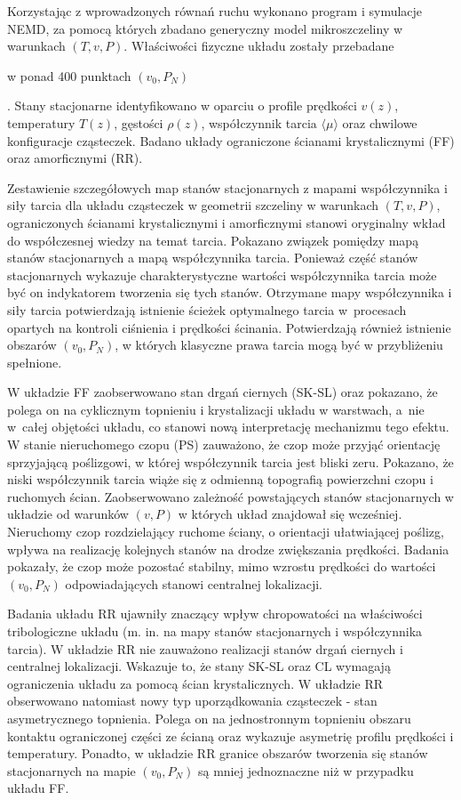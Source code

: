 \documentclass[12pt,a4paper,openright]{report} %
\begin{document}
Korzystając z wprowadzonych równań ruchu wykonano program i symulacje NEMD, za pomocą których zbadano generyczny model mikroszczeliny w warunkach $(T, v, P)$. Właściwości fizyczne układu zostały przebadane \begin{samepage} w ponad 400 punktach $(v_0, P_N)$ \end{samepage}. Stany stacjonarne identyfikowano w oparciu o profile prędkości $v(z)$, temperatury $T(z)$, gęstości $\rho(z)$, współczynnik tarcia $\langle \mu \rangle$ oraz chwilowe konfiguracje cząsteczek. Badano układy ograniczone ścianami krystalicznymi (FF) oraz amorficznymi (RR). 

Zestawienie szczegółowych map stanów stacjonarnych z mapami współczynnika i siły tarcia dla układu cząsteczek w geometrii szczeliny w warunkach $(T, v, P)$, ograniczonych ścianami krystalicznymi i amorficznymi stanowi oryginalny wkład do współczesnej wiedzy na temat tarcia.  
Pokazano związek pomiędzy mapą stanów stacjonarnych a mapą współczynnika tarcia. Ponieważ część stanów stacjonarnych wykazuje charakterystyczne wartości współczynnika tarcia może być on indykatorem tworzenia się tych stanów. 
Otrzymane mapy współczynnika i siły tarcia potwierdzają istnienie ścieżek optymalnego tarcia w~procesach opartych na kontroli ciśnienia i prędkości ścinania. Potwierdzają również istnienie obszarów $(v_0, P_N)$, w których klasyczne prawa tarcia mogą być w przybliżeniu spełnione.

W układzie FF zaobserwowano stan drgań ciernych (SK-SL) oraz pokazano, że polega on na cyklicznym topnieniu i krystalizacji układu w warstwach, a~nie w~całej objętości układu, co stanowi nową interpretację mechanizmu tego efektu. W stanie nieruchomego czopu (PS) zauważono, że czop może przyjąć orientację sprzyjającą poślizgowi, w której współczynnik tarcia jest bliski zeru. Pokazano, że niski współczynnik tarcia wiąże się z odmienną topografią powierzchni czopu i ruchomych ścian. Zaobserwowano zależność powstających stanów stacjonarnych w układzie od warunków $(v, P)$ w których układ znajdował się wcześniej. Nieruchomy czop rozdzielający ruchome ściany, o orientacji ułatwiającej poślizg, wpływa na realizację kolejnych stanów na drodze zwiększania prędkości. Badania pokazały, że czop może pozostać stabilny, mimo wzrostu prędkości do wartości $(v_0, P_N)$ odpowiadających stanowi centralnej lokalizacji. 

Badania układu RR ujawniły znaczący wpływ chropowatości na właściwości tribologiczne układu (m. in. na mapy stanów stacjonarnych i współczynnika tarcia). W układzie RR nie zauważono realizacji stanów drgań ciernych i centralnej lokalizacji. Wskazuje to, że stany SK-SL oraz CL wymagają ograniczenia układu za pomocą ścian krystalicznych. W układzie RR obserwowano natomiast nowy typ uporządkowania cząsteczek - stan asymetrycznego topnienia. Polega on na jednostronnym topnieniu obszaru kontaktu ograniczonej części ze ścianą oraz wykazuje asymetrię profilu prędkości i temperatury. Ponadto, w układzie RR granice obszarów tworzenia się stanów stacjonarnych na mapie $(v_0, P_N)$ są mniej jednoznaczne niż w przypadku układu FF.
\end{document}

